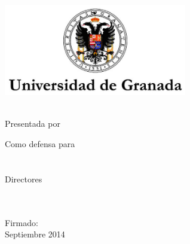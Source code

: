 \begin{titlepage}
    \begin{center}
        \large
        \vspace*{1.5cm}
        \includegraphics[width=8cm]{gfx/ugr_formal} \\

        \vspace{1.5cm}

        {\color{ugrOrange}\spacedallcaps{\myTitle}} \\ \bigskip
	{\textcolor{ugrGray} {\small Presentada por}} \\ \bigskip
        \spacedlowsmallcaps{\myName}

        \vspace{1.5cm}
\textcolor{ugrGray}
        {\small Como defensa para }\normalsize\\
        \large{} \\ 
        \large{} \\
\vspace{1.5cm}
\textcolor{ugrGray}{\small Directores }\normalsize\\
        \large\spacedlowsmallcaps{\myDirectorOne}\\
        \large\spacedlowsmallcaps{\myDirectorTwo}\\
        \vspace{3cm}

        {\small Firmado: \myName }\\ \bigskip
	Septiembre 2014


    \end{center}
\end{titlepage}   
